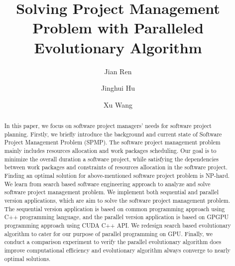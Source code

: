 %
\title{Solving Project Management Problem with Paralleled Evolutionary Algorithm}
%
%
\author{Jian Ren \and Jinghui Hu \and Xu Wang}
%
%
%

\maketitle

\begin{abstract}
In this paper, we focus on software project managers’ needs for
software project planning. Firstly, we briefly introduce
the background and current state of Software Project Management Problem (SPMP).
The software project management problem mainly includes resources allocation
and work packages scheduling. Our goal is to minimize the overall duration a software
project, while satisfying the dependencies between work packages and constraints of resources
allocation in the software project. Finding an optimal solution for above-mentioned software
project problem is NP-hard. We learn from search based software engineering approach to
analyze and solve software project management problem. We implement both sequential and
parallel version applications, which are aim to solve the software project management
problem. The sequential version application is based on common programming approach using
C++ programming language, and the parallel version application is based on GPGPU programming
approach using CUDA C++ API. We redesign search based evolutionary algorithm to cater for our
purpose of parallel programming on GPU. Finally, we conduct a comparison experiment to verify
the parallel evolutionary algorithm does improve computational efficiency and evolutionary
algorithm always converge to nearly optimal solutions. 
\end{abstract}
